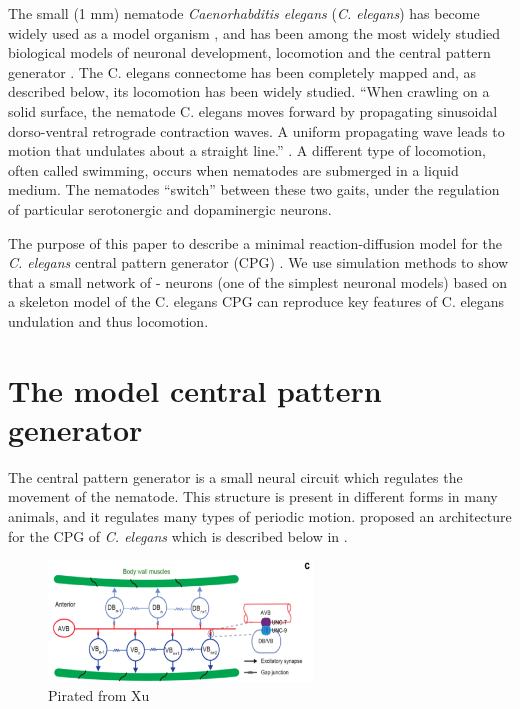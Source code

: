 \documentclass[
    11pt,
]{article}
\begin{document}
The small (1 mm) nematode \emph{Caenorhabditis elegans} (\emph{C. elegans}) has become widely used as a model organism \citep{corsi2015}, and has been among the most widely studied biological models of neuronal development, locomotion and the central pattern generator \citep{katz2016}.
The C. elegans connectome has been completely mapped \citep{jabr} and, as described below, its locomotion has been widely studied.
``When crawling on a solid surface, the nematode C. elegans moves forward by propagating sinusoidal dorso-ventral retrograde contraction waves. A uniform propagating wave leads to motion that undulates about a straight line.'' \citep{kim2011}.
A different type of locomotion, often called swimming, occurs when nematodes are submerged in a liquid medium. The nematodes “switch” between these two gaits, under the regulation of particular serotonergic and dopaminergic neurons.

The purpose of this paper to describe a minimal reaction-diffusion model for the \emph{C. elegans} central pattern generator (CPG) \citep{xu2018, wen2012}. We use simulation methods to show that a small network of \citet{fitzhugh1955}-\citet{nagumo1962} neurons (one of the simplest neuronal models) based on a skeleton model of the C. elegans CPG can reproduce key features of C. elegans undulation \citep{magnes2012} and thus locomotion.

\section{The model central pattern generator}

The central pattern generator is a small neural circuit which regulates the movement of the nematode.  This structure is present in different forms in many animals, and it regulates many types of periodic motion.  \citet{xu2018} proposed an architecture for the CPG of \emph{C. elegans} which is described below in .

\begin{figure}[h!]
    \label{fig: xu_cpg}
    \centering
    \includegraphics[width=7cm]{figures/xu_cpg/xu_cpg.png}
    \caption{Pirated from Xu}
\end{figure}
\end{document}
